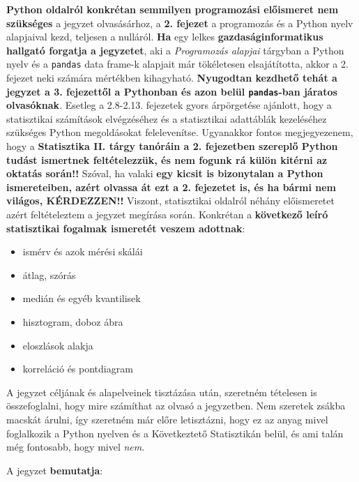 \documentclass[
]{book}
\providecommand{\tightlist}{%
  \setlength{\itemsep}{0pt}\setlength{\parskip}{0pt}}
\begin{document}
\textbf{Python oldalról konkrétan semmilyen programozási előismeret nem szükséges} a jegyzet olvasásárhoz, a \textbf{2. fejezet} a programozás és a Python nyelv alapjaival kezd, teljesen a nulláról. \textbf{Ha} egy lelkes \textbf{gazdaságinformatikus hallgató forgatja a jegyzetet}, aki a \emph{Programozás alapjai} tárgyban a Python nyelv és a \texttt{pandas} data frame-k alapjait már tökéletesen elsajátította, akkor a 2. fejezet neki számára mértékben kihagyható. \textbf{Nyugodtan kezdhető tehát a jegyzet a 3. fejezettől a Pythonban és azon belül \texttt{pandas}-ban járatos olvasóknak}. Esetleg a 2.8-2.13. fejezetek gyors árpörgetése ajánlott, hogy a statisztikai számítások elvégzéséhez és a statisztikai adattáblák kezeléséhez szükséges Python megoldásokat felelevenítse.
Ugyanakkor fontos megjegyezenem, hogy a \textbf{Statisztika II. tárgy tanóráin a 2. fejezetben szereplő Python tudást ismertnek feltételezzük, és nem fogunk rá külön kitérni az oktatás során!!} Szóval, ha valaki \textbf{egy kicsit is bizonytalan a Python ismereteiben, azért olvassa át ezt a 2. fejezetet is, és ha bármi nem világos, KÉRDEZZEN!!}
Viszont, statisztikai oldalról néhány előismeretet azért feltételeztem a jegyzet megírása során. Konkrétan a \textbf{következő leíró statisztikai fogalmak ismeretét veszem adottnak}:

\begin{itemize}
\tightlist
\item
  ismérv és azok mérési skálái
\item
  átlag, szórás
\item
  medián és egyéb kvantilisek
\item
  hisztogram, doboz ábra
\item
  eloszlások alakja
\item
  korreláció és pontdiagram
\end{itemize}

A jegyzet céljának és alapelveinek tisztázása után, szeretném tételesen is összefoglalni, hogy mire számíthat az olvasó a jegyzetben. Nem szeretek zsákba macskát árulni, így szeretném már előre letisztázni, hogy ez az anyag mivel foglalkozik a Python nyelven és a Következtető Statisztikán belül, és ami talán még fontosabb, hogy mivel \emph{nem}.

A jegyzet \textbf{bemutatja}:
\end{document}
